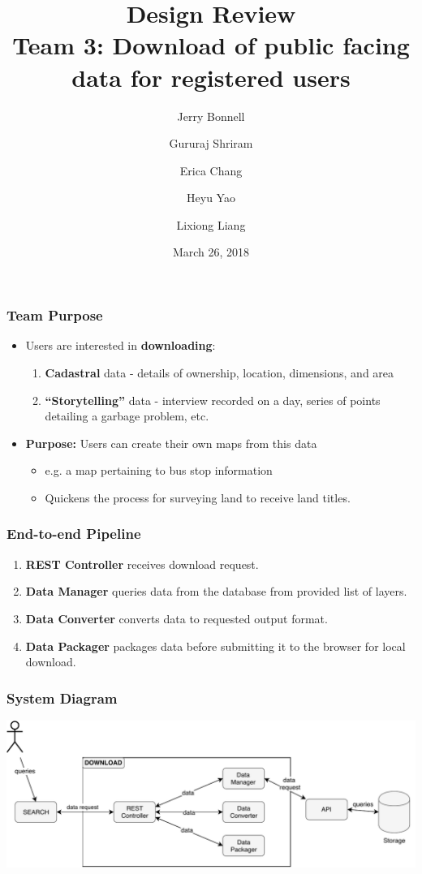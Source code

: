 \documentclass[xcolor=table]{beamer}
\title{
\textbf{Design Review} \\ \small{Team 3: Download of public facing data for registered users}
}
\author{
Jerry Bonnell
\and Gururaj Shriram
\and Erica Chang 
\and Heyu Yao
\and Lixiong Liang
} %
\date{March 26, 2018} %
\begin{document}
\begin{frame}[plain]
	\titlepage
\end{frame}

\begin{frame}
	\frametitle{Team Purpose}
	\begin{itemize}
		\item Users are interested in \textbf{downloading}:
		      \begin{block}{}
			      \begin{enumerate}
					  \item \textbf{Cadastral} data - details of ownership, 
					  location, dimensions, and area
					  \item \textbf{``Storytelling''} data - interview 
					  recorded on a day, series of points detailing a garbage 
					  problem, etc.
			      \end{enumerate}
			  \end{block}
		\item \textbf{Purpose:} Users can create their own maps from this data
			\begin{itemize}
				\item e.g. a map pertaining to bus stop information
				\item Quickens the process for surveying land to receive land 
				titles.
			\end{itemize}
	\end{itemize}
\end{frame}
\begin{frame}
	\frametitle{End-to-end Pipeline}
	\begin{enumerate}
		\item \textbf{REST Controller} receives download request.
		\item \textbf{Data Manager} queries data from the database from 
		provided list of layers. 
		\item \textbf{Data Converter} converts data to requested output format.
		\item \textbf{Data Packager} packages data before submitting 
		it to the browser for local download.
	\end{enumerate}
\end{frame}
\begin{frame}
	\frametitle{System Diagram}
		\includegraphics[width=\linewidth]{component.pdf}
\end{frame}
\end{document}
